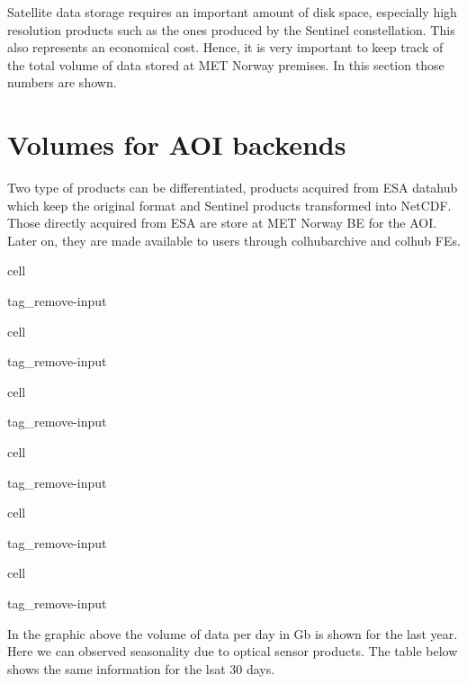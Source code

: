 \documentclass[letterpaper,10pt,english]{jupyterBook}
\begin{document}
\sphinxAtStartPar
Satellite data storage requires an important amount of disk space, especially high resolution products such as the ones produced by the Sentinel constellation. This also represents an economical cost. Hence, it is very important to keep track of the total volume of data stored at MET Norway premises. In this section those numbers are shown.


\section{Volumes for AOI backends}
\label{\detokenize{volumes:volumes-for-aoi-backends}}
\sphinxAtStartPar
Two type of products can be differentiated, products acquired from ESA datahub which keep the original format and Sentinel products transformed into NetCDF. Those directly acquired from ESA are store at MET Norway BE for the AOI. Later on, they are made available to users through colhub\sphinxhyphen{}archive and colhub FEs.

\begin{sphinxuseclass}{cell}
\begin{sphinxuseclass}{tag_remove-input}
\end{sphinxuseclass}
\end{sphinxuseclass}
\begin{sphinxuseclass}{cell}
\begin{sphinxuseclass}{tag_remove-input}
\end{sphinxuseclass}
\end{sphinxuseclass}
\begin{sphinxuseclass}{cell}
\begin{sphinxuseclass}{tag_remove-input}
\end{sphinxuseclass}
\end{sphinxuseclass}
\begin{sphinxuseclass}{cell}
\begin{sphinxuseclass}{tag_remove-input}
\end{sphinxuseclass}
\end{sphinxuseclass}
\begin{sphinxuseclass}{cell}
\begin{sphinxuseclass}{tag_remove-input}
\end{sphinxuseclass}
\end{sphinxuseclass}
\begin{sphinxuseclass}{cell}
\begin{sphinxuseclass}{tag_remove-input}
\end{sphinxuseclass}
\end{sphinxuseclass}
\sphinxAtStartPar
In the graphic above the volume of data per day in Gb is shown for the last year. Here we can observed seasonality due to optical sensor products. The table below shows the same information for the lsat 30 days.
\end{document}
